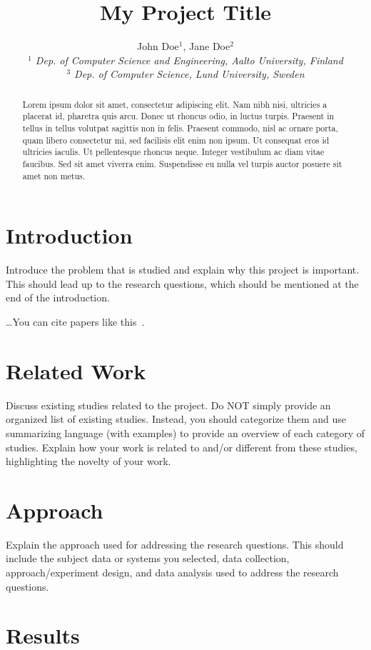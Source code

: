 \documentclass[10pt, conference]{IEEEtran}
\title{My Project Title}
\author{John Doe$^{1}$, Jane Doe$^{2}$
    \\
    \emph{$^{1}$ Dep. of Computer Science and Engineering, Aalto University, Finland}
    \\
    \emph{$^{3}$ Dep. of Computer Science, Lund University, Sweden}}
\begin{document}
\maketitle

\begin{abstract}
Lorem ipsum dolor sit amet, consectetur adipiscing elit. Nam nibh nisi, ultricies a placerat id, pharetra quis arcu. Donec ut rhoncus odio, in luctus turpis. Praesent in tellus in tellus volutpat sagittis non in felis. Praesent commodo, nisl ac ornare porta, quam libero consectetur mi, sed facilisis elit enim non ipsum. Ut consequat eros id ultricies iaculis. Ut pellentesque rhoncus neque. Integer vestibulum ac diam vitae faucibus. Sed sit amet viverra enim. Suspendisse eu nulla vel turpis auctor posuere sit amet non metus.
\end{abstract}


\section{Introduction}
\label{sec:introduction}

Introduce the problem that is studied and explain why this project is important. This should lead up to the research questions, which should be mentioned at the end of the introduction.

\dots You can cite papers like this~\cite{humble10}.

\section{Related Work}
\label{sec:related-work}
Discuss existing studies related to the project. Do NOT simply provide an organized list of existing studies. Instead, you should categorize them and use summarizing language (with examples) to provide an overview of each category of studies. Explain how your work is related to and/or different from these studies, highlighting the novelty of your work.

\section{Approach}
\label{sec:approach}

Explain the approach used for addressing the research questions. This should include the subject data or systems you selected, data collection, approach/experiment design, and data analysis used to address the research questions.


\section{Results}
\label{sec:results}
\end{document}
